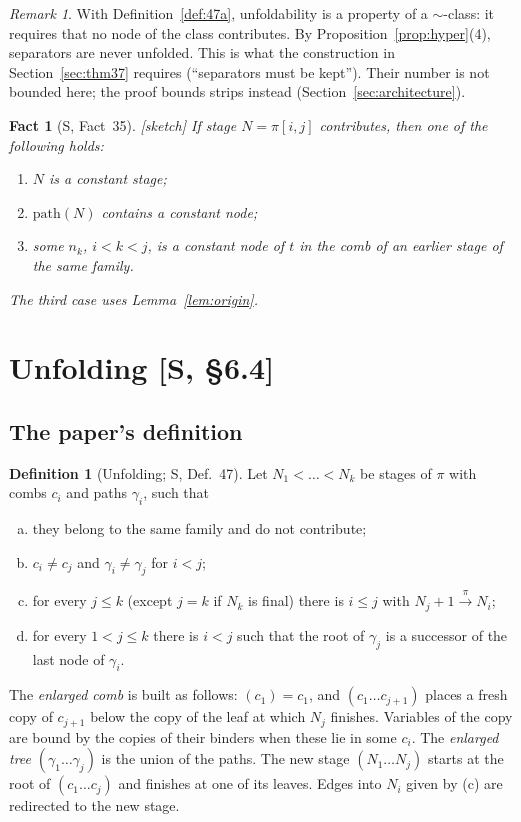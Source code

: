 \documentclass[11pt]{article}
\newcommand{\iv}[2]{\pi[#1,#2]}
\newcommand{\pth}{\mathrm{path}}
\newcommand{\ra}[1]{\xrightarrow{#1}}
\newcommand{\Sketch}{\textsf{[sketch]}}
\theoremstyle{plain}
\newtheorem{fact}[theorem]{Fact}
\theoremstyle{definition}
\newtheorem{definition}[theorem]{Definition}
\theoremstyle{remark}
\newtheorem{remark}[theorem]{Remark}
\begin{document}
\begin{remark}
With Definition~\ref{def:47a}, unfoldability is a property of a
$\sim$-class: it requires that no node of the class contributes.  By
Proposition~\ref{prop:hyper}(4), separators are never unfolded.  This is
what the construction in Section~\ref{sec:thm37} requires (``separators
must be kept'').  Their number is not bounded here; the proof bounds
strips instead (Section~\ref{sec:architecture}).
\end{remark}

\begin{fact}[S, Fact~35]\label{fact:35}
\Sketch{} If stage $N=\iv ij$ contributes, then one of the following
holds:
\begin{enumerate}
\item $N$ is a constant stage;
\item $\pth(N)$ contains a constant node;
\item some $n_k$, $i<k<j$, is a constant node of $t$ in the comb of an
  earlier stage of the same family.
\end{enumerate}
The third case uses Lemma~\ref{lem:origin}.
\end{fact}

\section{Unfolding [S, \S6.4]}\label{sec:unfolding}

\subsection{The paper's definition}

\begin{definition}[Unfolding; S, Def.~47]\label{def:unfold}
Let $N_1<\dots<N_k$ be stages of $\pi$ with combs $c_i$ and paths
$\gamma_i$, such that
\begin{enumerate}[(a)]
\item they belong to the same family and do not contribute;
\item $c_i\ne c_j$ and $\gamma_i\ne\gamma_j$ for $i<j$;
\item for every $j\le k$ (except $j=k$ if $N_k$ is final) there is
  $i\le j$ with $N_j+1\ra\pi N_i$;
\item for every $1<j\le k$ there is $i<j$ such that the root of
  $\gamma_j$ is a successor of the last node of $\gamma_i$.
\end{enumerate}
The \emph{enlarged comb} is built as follows: $(c_1)=c_1$, and
$(c_1\dots c_{j+1})$ places a fresh copy of $c_{j+1}$ below the copy of
the leaf at which $N_j$ finishes.  Variables of the copy are bound by
the copies of their binders when these lie in some $c_i$.  The
\emph{enlarged tree} $(\gamma_1\dots\gamma_j)$ is the union of the paths.
The new stage $(N_1\dots N_j)$ starts at the root of $(c_1\dots c_j)$
and finishes at one of its leaves.  Edges into $N_i$ given by (c) are
redirected to the new stage.
\end{definition}
\end{document}

